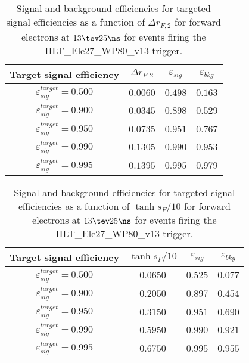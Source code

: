 \clearpage

\begin{table}[!bht]
  \begin{center}
    \begin{tabular}{cccc}
      \hline
      Target signal efficiency & $\Delta r_{F,2}$ & $\varepsilon_{sig}$ & $\varepsilon_{bkg}$ \\ 
      \hline
      $\varepsilon_{sig}^{target} = 0.500$ & $  0.0060$ & $0.498$ & $0.163$ \\
      $\varepsilon_{sig}^{target} = 0.900$ & $  0.0345$ & $0.898$ & $0.529$ \\
      $\varepsilon_{sig}^{target} = 0.950$ & $  0.0735$ & $0.951$ & $0.767$ \\
      $\varepsilon_{sig}^{target} = 0.990$ & $  0.1305$ & $0.990$ & $0.953$ \\
      $\varepsilon_{sig}^{target} = 0.995$ & $  0.1395$ & $0.995$ & $0.979$ \\
      \hline
    \end{tabular}
    \caption{Signal and background efficiencies for targeted signal efficiencies as a function of $\Delta r_{F,2}$ for forward electrons at $13\tev 25\ns$ for events firing the HLT\_Ele27\_WP80\_v13 trigger.}
    \label{tab:eff_rej_r2F_beam_13_25_trigger_27_F}
  \end{center}
\end{table}

\clearpage

\begin{table}[!bht]
  \begin{center}
    \begin{tabular}{cccc}
      \hline
      Target signal efficiency & $\tanh{s_F/10}$ & $\varepsilon_{sig}$ & $\varepsilon_{bkg}$ \\ 
      \hline
      $\varepsilon_{sig}^{target} = 0.500$ & $  0.0650$ & $0.525$ & $0.077$ \\
      $\varepsilon_{sig}^{target} = 0.900$ & $  0.2050$ & $0.897$ & $0.454$ \\
      $\varepsilon_{sig}^{target} = 0.950$ & $  0.3150$ & $0.951$ & $0.690$ \\
      $\varepsilon_{sig}^{target} = 0.990$ & $  0.5950$ & $0.990$ & $0.921$ \\
      $\varepsilon_{sig}^{target} = 0.995$ & $  0.6750$ & $0.995$ & $0.955$ \\
      \hline
    \end{tabular}
    \caption{Signal and background efficiencies for targeted signal efficiencies as a function of $\tanh{s_F/10}$ for forward electrons at $13\tev 25\ns$ for events firing the HLT\_Ele27\_WP80\_v13 trigger.}
    \label{tab:eff_rej_sF_beam_13_25_trigger_27_F}
  \end{center}
\end{table}

